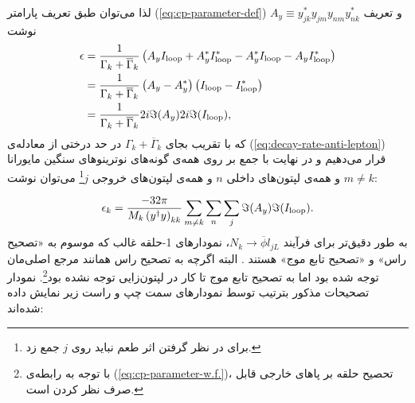 \documentclass[a4paper]{book}
\begin{document}
لذا می‌توان طبق تعریف پارامتر  (\ref{eq:cp-parameter-def}) و تعریف {\footnotesize$A_y\equiv y^*_{jk} y_{jm} y_{nm} y^*_{nk}$} نوشت
{\footnotesize\begin{align}
	\epsilon&=\frac{1}{\Gamma_k + \overline{\Gamma}_k} \left(A_y I_{\rm loop} + A_y^* I^*_{\rm loop}-A^*_y I_{\rm loop}-A_y I^*_{\rm loop}\right)\notag\\
	&=\frac{1}{\Gamma_k + \overline{\Gamma}_k} \left(A_y-A^*_y\right)\left(I_{\rm loop}-I_{\rm loop}^*\right)\notag\\
	&=\frac{1}{\Gamma_k + \overline{\Gamma}_k} 2i \Im(A_y) 2i \Im(I_{\rm loop}),
\end{align}}
که با تقریب بجای {\footnotesize$\Gamma_k + \overline{\Gamma}_k$} در حد درختی از معادله‌ی (\ref{eq:decay-rate-anti-lepton}) قرار می‌دهیم و در نهایت با جمع بر روی همه‌ی گونه‌های نوترینوهای سنگین مایورانا {\footnotesize$m\neq k$} و همه‌ی لپتون‌های داخلی {\footnotesize$n$} و همه‌ی لپتون‌های خروجی {\footnotesize$j$}\footnote{برای در نظر گرفتن اثر طعم نباید روی {\footnotesize$j$} جمع زد.} می‌توان نوشت:
\par
\vspace{-0.5cm}
{\footnotesize\begin{align}
	\epsilon_k=\frac{-32 \pi}{M_k \left(y^{\dagger} y\right)_{kk}} \sum_{m\neq k} \sum_{n} \sum_{j} \Im(A_y) \Im(I_{\rm loop}).
	\label{eq:cp-parameter}
\end{align}}
به طور دقیق‌تر برای فرآیند {\footnotesize$N_k \to \overline{\phi} l_{jL}$}، نمودار‌های 1-حلقه غالب که موسوم به «تصحیح راس» و «تصحیح تابع موج» هستند \cite{Covi:1996wh}. البته اگرچه به تصحیح راس همانند مرجع اصلی‌مان \cite{Luty:1992un} توجه شده بود اما به تصحیح تابع موج تا کار \cite{PhysRevD.48.4609} در لپتون‌زایی توجه نشده بود\footnote{با توجه به رابطه‌ی (\ref{eq:cp-parameter-w.f.})، تحصیح حلقه بر پاهای خارجی قابل صرف نظر کردن است.}. نمودار تصحیحات مذکور بترتیب توسط نمودارهای سمت چپ و راست زیر نمایش داده شده‌اند:
\par
\vspace{-0.5cm}
\end{document}
